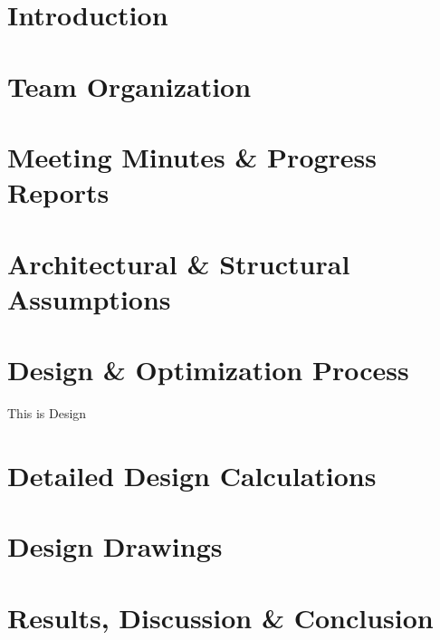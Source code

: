 \documentclass[12pt,twoside,a4paper,openany]{report}
\begin{document}



\section{Introduction}

\clearpage
\section{Team Organization}
\clearpage
\section{Meeting Minutes \& Progress Reports}
\clearpage
\section{Architectural \& Structural Assumptions}

\clearpage
\section{Design \& Optimization Process}
This is Design
\clearpage
\section{Detailed Design Calculations}

\clearpage
\section{Design Drawings}

\clearpage
\section{Results, Discussion \& Conclusion}

\end{document}
